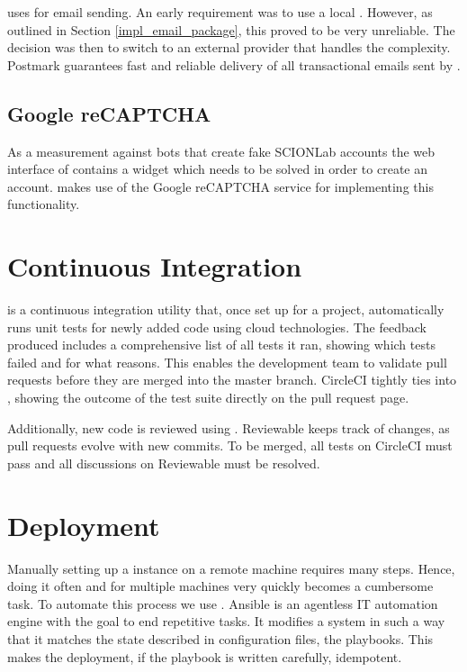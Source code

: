 \lcs uses  for email sending. An early requirement was to use a local . However, as outlined in Section \ref{impl_email_package}, this proved to be very unreliable. The decision was then to switch to an external provider that handles the complexity. Postmark guarantees fast and reliable delivery of all transactional emails sent by \lcs. \cite{postmark}

\subsection{Google reCAPTCHA}
As a measurement against bots that create fake SCIONLab accounts the web interface of \lcs contains a  widget which needs to be solved in order to create an account. \lcs makes use of the Google reCAPTCHA service for implementing this functionality.

\section{Continuous Integration}
\label{archi:ci}

 is a continuous integration utility that, once set up for a project, automatically runs unit tests for newly added code using cloud technologies. The feedback produced includes a comprehensive list of all tests it ran, showing which tests failed and for what reasons. This enables the \lcs development team to validate pull requests before they are merged into the master branch. CircleCI tightly ties into , showing the outcome of the test suite directly on the pull request page.

 Additionally, new code is reviewed using . Reviewable keeps track of changes, as pull requests evolve with new commits. To be merged, all tests on CircleCI must pass and all discussions on Reviewable must be resolved.


\section{Deployment}
\label{archi:ansi}

Manually setting up a \lcs instance on a remote machine requires many steps. Hence, doing it often  and for multiple machines very quickly becomes a cumbersome task. To automate this process we use . Ansible is an agentless IT automation engine with the goal to end repetitive tasks. It modifies a system in such a way that it matches the state described in configuration files, the playbooks. This makes the deployment, if the playbook is written carefully, idempotent.













